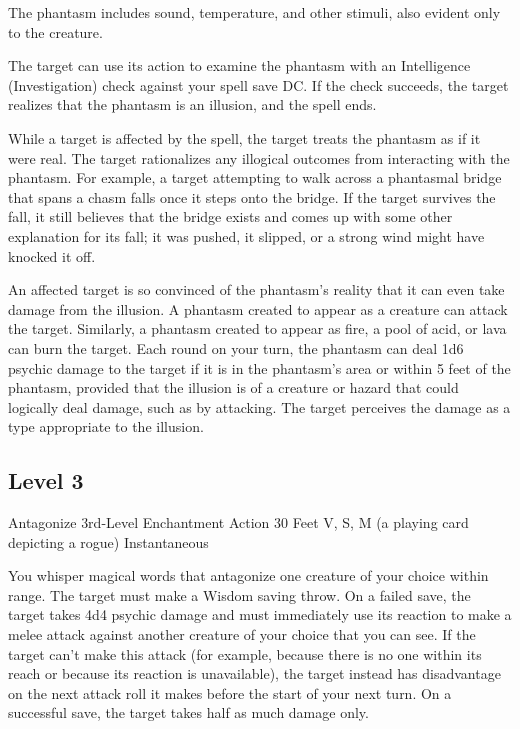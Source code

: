 \documentclass[letterpaper,openany,oneside,twocolumn]{book}
\begin{document}
The phantasm includes sound, temperature, and other stimuli, also evident only to the creature.

The target can use its action to examine the phantasm with an Intelligence (Investigation) check against your spell save DC. If the check succeeds, the target realizes that the phantasm is an illusion, and the spell ends.

While a target is affected by the spell, the target treats the phantasm as if it were real. The target rationalizes any illogical outcomes from interacting with the phantasm. For example, a target attempting to walk across a phantasmal bridge that spans a chasm falls once it steps onto the bridge. If the target survives the fall, it still believes that the bridge exists and comes up with some other explanation for its fall; it was pushed, it slipped, or a strong wind might have knocked it off.

An affected target is so convinced of the phantasm's reality that it can even take damage from the illusion. A phantasm created to appear as a creature can attack the target. Similarly, a phantasm created to appear as fire, a pool of acid, or lava can burn the target. Each round on your turn, the phantasm can deal 1d6 psychic damage to the target if it is in the phantasm's area or within 5 feet of the phantasm, provided that the illusion is of a creature or hazard that could logically deal damage, such as by attacking. The target perceives the damage as a type appropriate to the illusion.

\subsection*{Level 3}

\DndSpellHeader
  {Antagonize}
  {3rd-Level Enchantment}
  {Action}
  {30 Feet}
  {V, S, M (a playing card depicting a rogue)}
  {Instantaneous}

You whisper magical words that antagonize one creature of your choice within range. The target must make a Wisdom saving throw. On a failed save, the target takes 4d4 psychic damage and must immediately use its reaction to make a melee attack against another creature of your choice that you can see. If the target can't make this attack (for example, because there is no one within its reach or because its reaction is unavailable), the target instead has disadvantage on the next attack roll it makes before the start of your next turn. On a successful save, the target takes half as much damage only.
\end{document}
